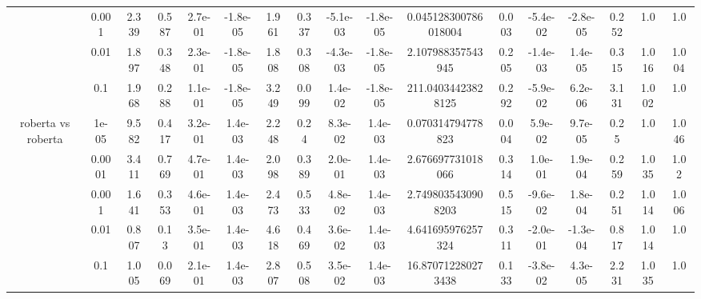 \begin{tabular}{|c|c|c|c|c|c|c|c|c|c|c|c|c|c|c|c|c|}
 & 0.001 & 2.339 & 0.587 & 2.7e-01 & -1.8e-05 & 1.961 & 0.337 & -5.1e-03 & -1.8e-05 & 0.045128300786018004 & 0.003 & -5.4e-02 & -2.8e-05 & 0.252 & 1.0 & 1.0 \\
 & 0.01 & 1.897 & 0.348 & 2.3e-01 & -1.8e-05 & 1.808 & 0.308 & -4.3e-03 & -1.8e-05 & 2.107988357543945 & 0.205 & -1.4e-03 & 1.4e-05 & 0.315 & 1.016 & 1.004 \\
 & 0.1 & 1.968 & 0.288 & 1.1e-01 & -1.8e-05 & 3.249 & 0.099 & 1.4e-02 & -1.8e-05 & 211.04034423828125 & 0.292 & -5.9e-02 & 6.2e-06 & 3.131 & 1.002 & 1.0 \\
\hline
\multirow{5}{*}{roberta  vs roberta } & 1e-05 & 9.582 & 0.417 & 3.2e-01 & 1.4e-03 & 2.248 & 0.24 & 8.3e-02 & 1.4e-03 & 0.070314794778823 & 0.004 & 5.9e-02 & 9.7e-05 & 0.25 & 1.0 & 1.046 \\
 & 0.0001 & 3.411 & 0.769 & 4.7e-01 & 1.4e-03 & 2.098 & 0.389 & 2.0e-01 & 1.4e-03 & 2.676697731018066 & 0.314 & 1.0e-01 & 1.9e-04 & 0.259 & 1.035 & 1.02 \\
 & 0.001 & 1.641 & 0.353 & 4.6e-01 & 1.4e-03 & 2.473 & 0.533 & 4.8e-02 & 1.4e-03 & 2.7498035430908203 & 0.515 & -9.6e-02 & 1.8e-04 & 0.251 & 1.014 & 1.006 \\
 & 0.01 & 0.807 & 0.13 & 3.5e-01 & 1.4e-03 & 4.618 & 0.469 & 3.6e-02 & 1.4e-03 & 4.641695976257324 & 0.311 & -2.0e-01 & -1.3e-04 & 0.817 & 1.014 & 1.0 \\
 & 0.1 & 1.005 & 0.069 & 2.1e-01 & 1.4e-03 & 2.807 & 0.508 & 3.5e-02 & 1.4e-03 & 16.870712280273438 & 0.133 & -3.8e-02 & 4.3e-05 & 2.231 & 1.035 & 1.0 \\
\hline
\end{tabular}